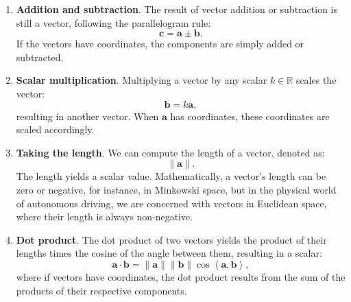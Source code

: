 \begin{enumerate}
	\item \textbf{Addition and subtraction}. The result of vector addition or subtraction is still a vector, following the parallelogram rule:
	\begin{equation}
		\mathbf{c} = \mathbf{a} \pm \mathbf{b}.
	\end{equation}
	If the vectors have coordinates, the components are simply added or subtracted.
	
	\item \textbf{Scalar multiplication}. Multiplying a vector by any scalar $k\in \mathbb{R}$ scales the vector:
	\begin{equation}
		\mathbf{b} = k \mathbf{a},
	\end{equation}
	resulting in another vector. When $\mathbf{a}$ has coordinates, these coordinates are scaled accordingly.
	
	\item \textbf{Taking the length}. We can compute the length of a vector, denoted as:
	\begin{equation}
		\| \mathbf{a} \|.
	\end{equation}
	The length yields a scalar value. Mathematically, a vector's length can be zero or negative, for instance, in Minkowski space, but in the physical world of autonomous driving, we are concerned with vectors in Euclidean space, where their length is always non-negative.
	
	\item \textbf{Dot product}. The dot product of two vectors yields the product of their lengths times the cosine of the angle between them, resulting in a scalar:
	\begin{equation}
		\mathbf{a} \cdot \mathbf{b} = \|\mathbf{a} \| \|\mathbf{b} \| \cos \left\langle\mathbf{a},\mathbf{b} \right\rangle,
	\end{equation}
	where if vectors have coordinates, the dot product results from the sum of the products of their respective components.
	

\end{enumerate}
